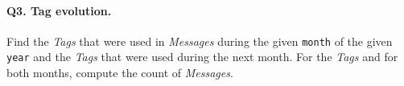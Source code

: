 \paragraph{\textbf{Q3}. Tag evolution.}
Find the \emph{Tags} that were used in \emph{Messages} during the given
\texttt{month} of the given \texttt{year} and the \emph{Tags} that were
used during the next month.
For the \emph{Tags} and for both months, compute the count of
\emph{Messages}.

